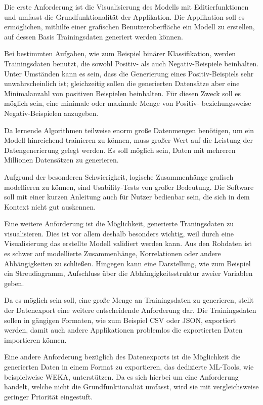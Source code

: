 Die erste Anforderung ist die Visualisierung des Modells mit Editierfunktionen und umfasst die Grundfunktionalität der Applikation. Die Applikation soll es ermöglichen, mithilfe einer grafischen \mbox{Benutzeroberfläche} ein Modell zu erstellen, auf dessen Basis Trainingsdaten generiert werden können.

Bei bestimmten Aufgaben, wie zum Beispiel binärer Klassifikation, werden Trainingsdaten benutzt, die sowohl Positiv- als auch Negativ-Beispiele beinhalten. Unter Umständen kann es sein, dass die Generierung eines Positiv-Beispiels sehr unwahrscheinlich ist; gleichzeitig sollen die generierten Datensätze aber eine Minimalanzahl von positiven Beispielen beinhalten. Für diesen Zweck soll es möglich sein, eine minimale oder maximale Menge von Positiv- beziehungsweise Negativ-Beispielen anzugeben.

Da lernende Algorithmen teilweise enorm große Datenmengen benötigen, um ein Modell hinreichend trainieren zu können, muss großer Wert auf die Leistung der Datengenerierung gelegt werden. Es soll möglich sein, Daten mit mehreren Millionen Datensätzen zu generieren.

Aufgrund der besonderen Schwierigkeit, logische Zusammenhänge grafisch modellieren zu können, sind Usability-Tests von großer Bedeutung. Die Software soll mit einer kurzen Anleitung auch für Nutzer bedienbar sein, die sich in dem Kontext nicht gut auskennen.

Eine weitere Anforderung ist die Möglichkeit, generierte Traningsdaten zu visualisieren. Dies ist vor allem deshalb besonders wichtig, weil durch eine Visualisierung das erstellte Modell validiert werden kann. Aus den Rohdaten ist es schwer auf modellierte Zusammenhänge, Korrelationen oder andere Abhängigkeiten zu schließen. Hingegen kann eine Darstellung, wie zum Beispiel ein Streudiagramm, Aufschluss über die Abhängigkeitsstruktur zweier Variablen geben.

Da es möglich sein soll, eine große Menge an Trainingsdaten zu generieren, stellt der Datenexport eine weitere entscheidende Anforderung dar. Die Trainingsdaten sollen in gängigen Formaten, wie zum Beispiel \ac{CSV} oder JSON, exportiert werden, damit auch andere Applikationen problemlos die exportierten Daten importieren können.

Eine andere Anforderung bezüglich des Datenexports ist die Möglichkeit die generierten Daten in einem Format zu exportieren, das dedizierte \ac{ML}-Tools, wie beispielweise WEKA, unterstützen. Da es sich hierbei um eine Anforderung handelt, welche nicht die Grundfunktionaliät umfasst, wird sie mit vergleichsweise geringer Priorität eingestuft.

